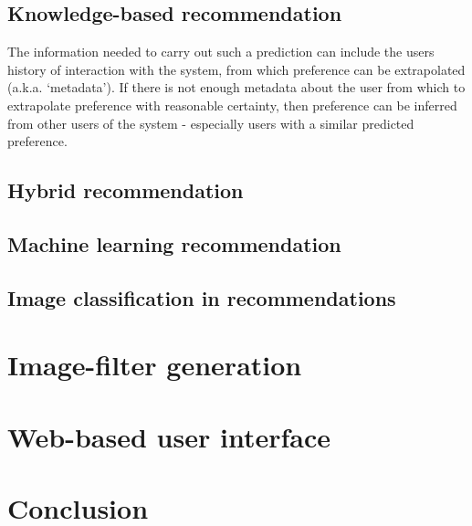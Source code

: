 \documentclass[a4paper,12pt]{article}
\begin{document}
  \subsection{Knowledge-based recommendation}
    The information needed to carry out such a prediction can include the users history of interaction with the system, from which preference can be extrapolated (a.k.a. ‘metadata’). If there is not enough metadata about the user from which to extrapolate preference with reasonable certainty, then preference can be inferred from other users of the system - especially users with a similar predicted preference.

  \subsection{Hybrid recommendation}

  \subsection{Machine learning recommendation}

  \subsection{Image classification in recommendations}

\section{Image-filter generation}

\section{Web-based user interface}

\section{Conclusion}



\end{document}
